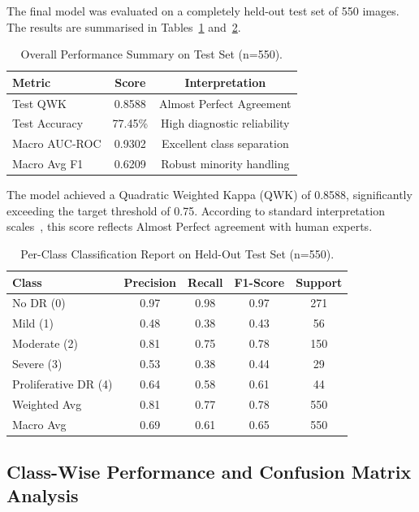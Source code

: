 \documentclass[10pt,twoside]{article}
\begin{document}
The final model was evaluated on a completely held-out test set of 550 images. The results are summarised in Tables~\ref{tab:overall} and~\ref{tab:perclass}.

\begin{table}[ht]
\caption{Overall Performance Summary on Test Set (n=550).}
\centering
\label{tab:overall}
\begin{tabular}{lcc}
\toprule
Metric & Score & Interpretation \\
\midrule
Test QWK & 0.8588 & Almost Perfect Agreement \\
Test Accuracy & 77.45\% & High diagnostic reliability \\
Macro AUC-ROC & 0.9302 & Excellent class separation \\
Macro Avg F1 & 0.6209 & Robust minority handling \\
\bottomrule
\end{tabular}
\end{table}

The model achieved a Quadratic Weighted Kappa (QWK) of 0.8588, significantly exceeding the target threshold of 0.75. According to standard interpretation scales~\cite{mchugh2012interrater}, this score reflects Almost Perfect agreement with human experts.

\begin{table}[ht]
\caption{Per-Class Classification Report on Held-Out Test Set (n=550).}
\centering
\label{tab:perclass}
\begin{tabular}{lcccc}
\toprule
Class & Precision & Recall & F1-Score & Support \\
\midrule
No DR (0) & 0.97 & 0.98 & 0.97 & 271 \\
Mild (1) & 0.48 & 0.38 & 0.43 & 56 \\
Moderate (2) & 0.81 & 0.75 & 0.78 & 150 \\
Severe (3) & 0.53 & 0.38 & 0.44 & 29 \\
Proliferative DR (4) & 0.64 & 0.58 & 0.61 & 44 \\
\midrule
Weighted Avg & 0.81 & 0.77 & 0.78 & 550 \\
Macro Avg & 0.69 & 0.61 & 0.65 & 550 \\
\bottomrule
\end{tabular}
\end{table}

\subsection{Class-Wise Performance and Confusion Matrix Analysis}
\end{document}
